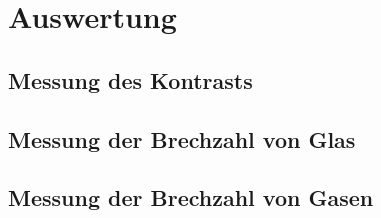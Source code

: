 
\section{Auswertung}

\subsection{Messung des Kontrasts}

\subsection{Messung der Brechzahl von Glas}

\subsection{Messung der Brechzahl von Gasen}
